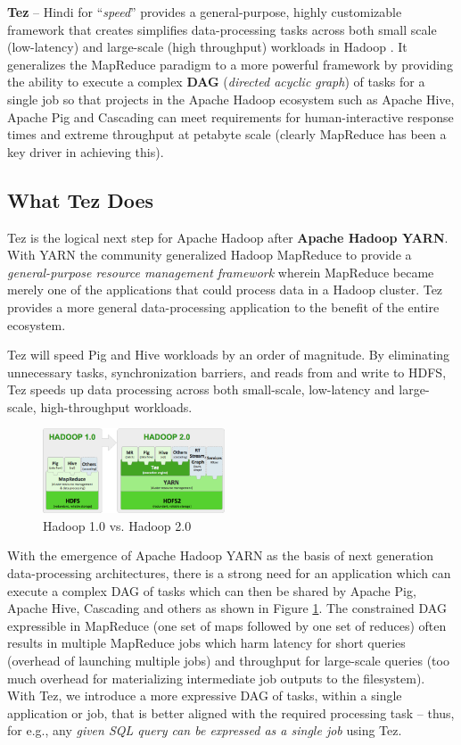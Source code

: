 \documentclass[twocolumn]{article}
\begin{document}
\textbf{Tez} -- Hindi for ``\emph{speed}'' provides a general-purpose, highly customizable
framework that creates simplifies data-processing tasks across both
small scale (low-latency) and large-scale (high throughput) workloads in
Hadoop \cite{Saha:2013-01}. It generalizes the MapReduce paradigm to a more powerful
framework by providing the ability to execute a complex \textbf{DAG}
(\emph{directed acyclic graph}) of tasks for a single job so that
projects in the Apache Hadoop ecosystem such as Apache Hive, Apache Pig
and Cascading can meet requirements for human-interactive response times
and extreme throughput at petabyte scale (clearly MapReduce has been a
key driver in achieving this).

\subsection{What Tez Does}

Tez is the logical next step for Apache Hadoop after \textbf{Apache
Hadoop YARN}. With YARN the community generalized Hadoop MapReduce to
provide a \emph{general-purpose resource management framework} wherein
MapReduce became merely one of the applications that could process data
in a Hadoop cluster. Tez provides a more general data-processing
application to the benefit of the entire ecosystem.

Tez will speed Pig and Hive workloads by an order of magnitude. By
eliminating unnecessary tasks, synchronization barriers, and reads from
and write to HDFS, Tez speeds up data processing across both
small-scale, low-latency and large-scale, high-throughput workloads.

\begin{figure}[htb]
        \centering
        \includegraphics[width=0.48\textwidth]{hadoopstack}
        \caption{Hadoop 1.0 vs. Hadoop 2.0}
        \label{fig01}
\end{figure}

With the emergence of Apache Hadoop YARN as the basis of next generation
data-processing architectures, there is a strong need for an application
which can execute a complex DAG of tasks which can then be shared by
Apache Pig, Apache Hive, Cascading and others as shown in Figure \ref{fig01}. The constrained DAG
expressible in MapReduce (one set of maps followed by one set of
reduces) often results in multiple MapReduce jobs which harm latency for
short queries (overhead of launching multiple jobs) and throughput for
large-scale queries (too much overhead for materializing intermediate
job outputs to the filesystem). With Tez, we introduce a more expressive
DAG of tasks, within a single application or job, that is better aligned
with the required processing task -- thus, for e.g., any \emph{given SQL
query can be expressed as a single job} using Tez.
\end{document}
